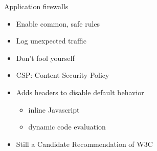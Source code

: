 \begin{frame}[plain]{Application firewalls}
 \begin{itemize}[<+-| alert@+>]
   \item Enable common, safe rules
   \item Log unexpected traffic
   \item Don't fool yourself
 \end{itemize}
\end{frame}

\begin{frame}[plain]
 \begin{itemize}
  \item CSP: Content Security Policy
  \item Adds headers to disable default behavior
   \begin{itemize}
     \item inline Javascript
     \item dynamic code evaluation
   \end{itemize}
  \item Still a Candidate Recommendation of W3C
 \end{itemize}
\end{frame}
